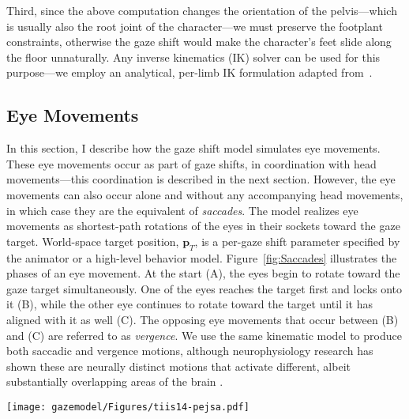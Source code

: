 Third, since the above computation changes the orientation of the pelvis---which is usually also the root joint of the character---we must preserve the footplant constraints, otherwise the gaze shift would make the character's feet slide along the floor unnaturally. Any inverse kinematics (IK) solver can be used for this purpose---we employ an analytical, per-limb IK formulation adapted from~\citep{shin2001puppetry}.

\subsection{Eye Movements}
\label{sec:GazeShiftEyes}

In this section, I describe how the gaze shift model simulates eye movements. These eye movements occur as part of gaze shifts, in coordination with head movements---this coordination is described in the next section. However, the eye movements can also occur alone and without any accompanying head movements, in which case they are the equivalent of \emph{saccades}.
The model realizes eye movements as shortest-path rotations of the eyes in their sockets toward the gaze target. World-space target position, $\mathbf{p}_T$, is a per-gaze shift parameter specified by the animator or a high-level behavior model. Figure~\ref{fig:Saccades} illustrates the phases of an eye movement. At the start (A), the eyes begin to rotate toward the gaze target simultaneously. One of the eyes reaches the target first and locks onto it (B), while the other eye continues to rotate toward the target until it has aligned with it as well (C). The opposing eye movements that occur between (B) and (C) are referred to as \emph{vergence}. We use the same kinematic model to produce both saccadic and vergence motions, although neurophysiology research has shown these are neurally distinct motions that activate different, albeit substantially overlapping areas of the brain \citep{alkan2011differentiation}.

\begin{figure*}
\centering
\texttt{[image: gazemodel/Figures/tiis14-pejsa.pdf]}
\caption{Phases of an eye saccade. Dashed arrows indicate eye gaze directions, while the curved arrow indicates the direction of the rotational movement. Saccade proceeds as follows: (A) Eyes begin to rotate toward the target. (B) First eye has reached the target. (C) Both eyes have reached the target.}
\label{fig:Saccades}
\end{figure*}

